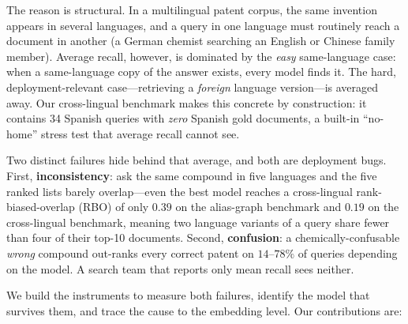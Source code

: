 \documentclass[11pt]{article}
\begin{document}
The reason is structural. In a multilingual patent corpus, the same invention
appears in several languages, and a query in one language must routinely reach
a document in another (a German chemist searching an English or Chinese family
member). Average recall, however, is dominated by the \emph{easy}
same-language case: when a same-language copy of the answer exists, every model
finds it. The hard, deployment-relevant case---retrieving a \emph{foreign}
language version---is averaged away. Our cross-lingual benchmark makes this
concrete by construction: it contains 34 Spanish queries with \emph{zero}
Spanish gold documents, a built-in ``no-home'' stress test that average recall
cannot see.

Two distinct failures hide behind that average, and both are deployment bugs.
First, \textbf{inconsistency}: ask the same compound in five languages and the
five ranked lists barely overlap---even the best model reaches a cross-lingual
rank-biased-overlap (RBO) of only $0.39$ on the alias-graph benchmark and
$0.19$ on the cross-lingual benchmark, meaning two language variants of a query
share fewer than four of their top-10 documents. Second, \textbf{confusion}: a
chemically-confusable \emph{wrong} compound out-ranks every correct patent on
$14$--$78\%$ of queries depending on the model. A search team that reports only
mean recall sees neither.

We build the instruments to measure both failures, identify the model that
survives them, and trace the cause to the embedding level. Our contributions
are:
\end{document}
